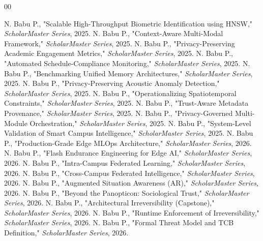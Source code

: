 \documentclass[conference]{IEEEtran}
\begin{document}
\begin{thebibliography}{00}

 N. Babu P., "Scalable High-Throughput Biometric Identification using HNSW," \textit{ScholarMaster Series}, 2025.
 N. Babu P., "Context-Aware Multi-Modal Framework," \textit{ScholarMaster Series}, 2025.
 N. Babu P., "Privacy-Preserving Academic Engagement Metrics," \textit{ScholarMaster Series}, 2025.
 N. Babu P., "Automated Schedule-Compliance Monitoring," \textit{ScholarMaster Series}, 2025.
 N. Babu P., "Benchmarking Unified Memory Architectures," \textit{ScholarMaster Series}, 2025.
 N. Babu P., "Privacy-Preserving Acoustic Anomaly Detection," \textit{ScholarMaster Series}, 2025.
 N. Babu P., "Operationalizing Spatiotemporal Constraints," \textit{ScholarMaster Series}, 2025.
 N. Babu P., "Trust-Aware Metadata Provenance," \textit{ScholarMaster Series}, 2025.
 N. Babu P., "Privacy-Governed Multi-Module Orchestration," \textit{ScholarMaster Series}, 2025.
 N. Babu P., "System-Level Validation of Smart Campus Intelligence," \textit{ScholarMaster Series}, 2025.
 N. Babu P., "Production-Grade Edge MLOps Architecture," \textit{ScholarMaster Series}, 2026.
 N. Babu P., "Flash Endurance Engineering for Edge AI," \textit{ScholarMaster Series}, 2026.
 N. Babu P., "Intra-Campus Federated Learning," \textit{ScholarMaster Series}, 2026.
 N. Babu P., "Cross-Campus Federated Intelligence," \textit{ScholarMaster Series}, 2026.
 N. Babu P., "Augmented Situation Awareness (AR)," \textit{ScholarMaster Series}, 2026.
 N. Babu P., "Beyond the Panopticon: Sociological Trust," \textit{ScholarMaster Series}, 2026.
 N. Babu P., "Architectural Irreversibility (Capstone)," \textit{ScholarMaster Series}, 2026.
 N. Babu P., "Runtime Enforcement of Irreversibility," \textit{ScholarMaster Series}, 2026.
 N. Babu P., "Formal Threat Model and TCB Definition," \textit{ScholarMaster Series}, 2026.

\end{thebibliography}
\end{document}

